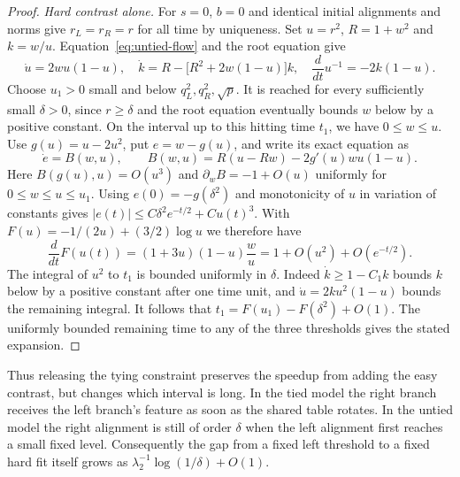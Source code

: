 \begin{proof}
\emph{Hard contrast alone.}
For $s=0$, $b=0$ and identical initial alignments and norms give
$r_L=r_R=r$ for all time by uniqueness. Set $u=r^2$, $R=1+w^2$ and
$k=w/u$. Equation~\eqref{eq:untied-flow} and the root equation give
\[
 \dot u=2wu(1-u),\quad
 \dot k=R-\big[R^2+2w(1-u)\big]k,\quad
 \frac{d}{dt}u^{-1}=-2k(1-u).
\]
Choose $u_1>0$ small and below $q_L^2,q_R^2,\sqrt p$. It is reached
for every sufficiently small $\delta>0$, since $r\ge\delta$ and the
root equation eventually bounds $w$ below by a positive constant.
On the interval up to this hitting time $t_1$, we have $0\le w\le u$.
Use $g(u)=u-2u^2$, put $e=w-g(u)$, and write its exact equation as
\[
 \dot e=B(w,u),\qquad B(w,u)=R(u-Rw)-2g'(u)wu(1-u).
\]
Here $B(g(u),u)=O(u^3)$ and $\partial_wB=-1+O(u)$ uniformly for
$0\le w\le u\le u_1$. Using $e(0)=-g(\delta^2)$ and monotonicity of $u$
in variation of constants gives
$|e(t)|\le C\delta^2 e^{-t/2}+Cu(t)^3$.
With $F(u)=-1/(2u)+(3/2)\log u$ we therefore have
\[
 \frac{d}{dt}F(u(t))=(1+3u)(1-u)\frac{w}{u}
 =1+O(u^2)+O(e^{-t/2}).
\]
The integral of $u^2$ to $t_1$ is bounded uniformly in $\delta$.
Indeed $\dot k\ge1-C_1k$ bounds $k$ below by a positive constant
after one time unit, and $\dot u=2ku^2(1-u)$ bounds the remaining integral.
It follows that $t_1=F(u_1)-F(\delta^2)+O(1)$. The uniformly bounded
remaining time to any of the three thresholds gives the stated expansion.
\end{proof}

Thus releasing the tying constraint preserves the speedup from adding
the easy contrast, but changes which interval is long. In the tied model
the right branch receives the left branch's feature as soon as the shared
table rotates. In the untied model the right alignment is still of order
$\delta$ when the left alignment first reaches a small fixed level.
Consequently the gap from a fixed left threshold to a fixed hard fit
itself grows as $\lambda_2^{-1}\log(1/\delta)+O(1)$.
